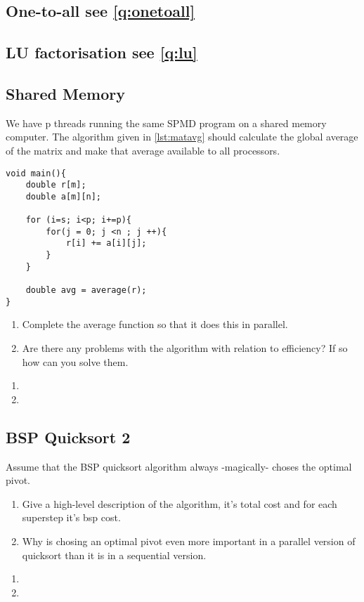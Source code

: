 \documentclass[../main.tex]{subfiles}
\begin{document}
\subsection{One-to-all see \autoref{q:onetoall}}
\subsection{LU factorisation see \autoref{q:lu}}
\subsection{Shared Memory}
\label{q:sm2}
\begin{question}
	We have p threads running the same SPMD program on a shared memory computer.
	The algorithm given in \autoref{lst:matavg} should calculate the global average of the matrix and make that average available to all processors.
\begin{lstlisting}[caption={Matrix average program on a shared memory computer},label=lst:matavg]
void main(){
	double r[m];
	double a[m][n];

	for (i=s; i<p; i+=p){
		for(j = 0; j <n ; j ++){
			r[i] += a[i][j];
		}	
	}

	double avg = average(r);
}
\end{lstlisting}
\begin{enumerate}
	\item Complete the average function so that it does this in parallel.
	\item Are there any problems with the algorithm with relation to efficiency? If so how can you solve them.
\end{enumerate}

\end{question}

\begin{solution}
\begin{enumerate}
	\item
	\item
\end{enumerate}
\end{solution}
\subsection{BSP Quicksort 2}
\label{q:qsort2}
\begin{question}
Assume that the BSP quicksort algorithm always -magically- choses the optimal pivot. 
\begin{enumerate}
	\item Give a high-level description of the algorithm, it's total cost and for each superstep it's bsp cost.
	\item Why is chosing an optimal pivot even more important in a parallel version of quicksort than it is in a sequential version.
\end{enumerate}
\end{question}
\begin{solution}
\begin{enumerate}
	\item 
	\item 
\end{enumerate}
\end{solution}
\end{document}
